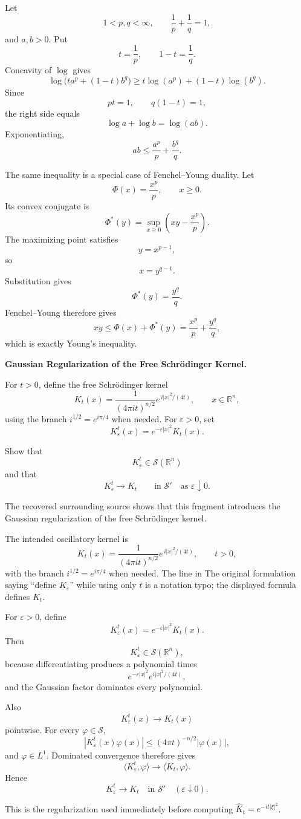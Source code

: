 \begin{solution}
Let
\[
1<p,q<\infty,
\qquad
\frac1p+\frac1q=1,
\]
and \(a,b>0\). Put
\[
t=\frac1p,
\qquad
1-t=\frac1q.
\]
Concavity of \(\log\) gives
\[
\log\bigl(ta^p+(1-t)b^q\bigr)
\ge
t\log(a^p)+(1-t)\log(b^q).
\]
Since
\[
pt=1,
\qquad
q(1-t)=1,
\]
the right side equals
\[
\log a+\log b=\log(ab).
\]
Exponentiating,
\[
\boxed{
ab
\le
\frac{a^p}{p}
+
\frac{b^q}{q}.
}
\]

The same inequality is a special case of Fenchel--Young duality. Let
\[
\Phi(x)=\frac{x^p}{p},
\qquad x\ge0.
\]
Its convex conjugate is
\[
\Phi^*(y)
=
\sup_{x\ge0}
\left(
xy-\frac{x^p}{p}
\right).
\]
The maximizing point satisfies
\[
y=x^{p-1},
\]
so
\[
x=y^{q-1}.
\]
Substitution gives
\[
\Phi^*(y)=\frac{y^q}{q}.
\]
Fenchel--Young therefore gives
\[
xy\le\Phi(x)+\Phi^*(y)
=
\frac{x^p}{p}+\frac{y^q}{q},
\]
which is exactly Young's inequality.
\end{solution}


\begin{problem}[CP-II-0245]
\label{prob:cp-ii-0245}
\textbf{Gaussian Regularization of the Free Schrödinger Kernel.}

\hspace*{1.5em}For \(t>0\), define the free Schrödinger kernel
\[
K_t(x)
=
\frac1{(4\pi i t)^{n/2}}
e^{\,i|x|^2/(4t)},
\qquad x\in\mathbb R^n,
\]
using the branch \(i^{1/2}=e^{i\pi/4}\) when needed. For
\(\varepsilon>0\), set
\[
K_\varepsilon^t(x)
=
e^{-\varepsilon|x|^2}K_t(x).
\]

Show that
\[
K_\varepsilon^t\in\mathcal S(\mathbb R^n)
\]
and that
\[
K_\varepsilon^t\longrightarrow K_t
\qquad\text{in }\mathcal S'
\quad\text{as }\varepsilon\downarrow0.
\]
\end{problem}

\begin{solution}
The recovered surrounding source shows that this fragment introduces the Gaussian
regularization of the free Schrödinger kernel.

The intended oscillatory kernel is
\[
\boxed{
K_t(x)
=
\frac1{(4\pi i t)^{n/2}}
e^{\,i|x|^2/(4t)},
\qquad t>0,
}
\]
with the branch \(i^{1/2}=e^{i\pi/4}\) when needed. The line in The original formulation saying
``define \(K_\varepsilon\)'' while using only \(t\) is a notation typo; the displayed formula
defines \(K_t\).

For \(\varepsilon>0\), define
\[
K_\varepsilon^t(x)
=
e^{-\varepsilon|x|^2}K_t(x).
\]
Then
\[
K_\varepsilon^t\in\mathcal S(\mathbb R^n),
\]
because differentiating produces a polynomial times
\[
e^{-\varepsilon|x|^2}e^{i|x|^2/(4t)},
\]
and the Gaussian factor dominates every polynomial.

Also
\[
K_\varepsilon^t(x)\to K_t(x)
\]
pointwise. For every \(\varphi\in\mathcal S\),
\[
|K_\varepsilon^t(x)\varphi(x)|
\le
(4\pi t)^{-n/2}|\varphi(x)|,
\]
and \(\varphi\in L^1\). Dominated convergence therefore gives
\[
\langle K_\varepsilon^t,\varphi\rangle
\longrightarrow
\langle K_t,\varphi\rangle.
\]
Hence
\[
\boxed{
K_\varepsilon^t\to K_t
\quad\text{in }\mathcal S'
\quad(\varepsilon\downarrow0).
}
\]

This is the regularization used immediately before computing
\(\widehat K_t=e^{-it|\xi|^2}\).
\end{solution}


